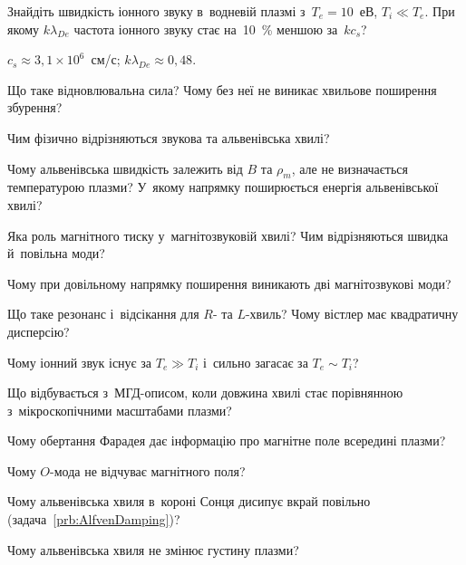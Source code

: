 \begin{problem}\label{prb:IonAcoustic}
	Знайдіть швидкість іонного звуку в~водневій плазмі з~$T_e=10$~еВ, $T_i\ll T_e$. При якому $k\lambda_{De}$
	частота іонного звуку стає на~10~\% меншою за~$kc_s$?
	\begin{solution}
		$c_s\approx3{,}1\times10^{6}$~см/с; $k\lambda_{De}\approx0{,}48$.
	\end{solution}
\end{problem}


\begin{Questions}
\begin{quizlist}

\item Що таке відновлювальна сила? Чому без неї не виникає хвильове поширення збурення?

\item Чим фізично відрізняються звукова та альвенівська хвилі?

\item Чому альвенівська швидкість залежить від $B$ та $\rho_m$, але не визначається
  температурою плазми? У~якому напрямку поширюється енергія альвенівської хвилі?

\item Яка роль магнітного тиску у~магнітозвуковій хвилі? Чим відрізняються швидка й~повільна моди?

\item Чому при довільному напрямку поширення виникають дві магнітозвукові моди?

\item Що таке резонанс і~відсікання для $R$- та $L$-хвиль? Чому вістлер має квадратичну дисперсію?

\item Чому іонний звук існує за $T_e\gg T_i$ і~сильно загасає за $T_e\sim T_i$?

\item Що відбувається з~МГД-описом, коли довжина хвилі стає порівнянною з~мікроскопічними
  масштабами плазми?

\item Чому обертання Фарадея дає інформацію про магнітне поле всередині плазми?

\item Чому $O$-мода не відчуває магнітного поля?

\item Чому альвенівська хвиля в~короні Сонця дисипує вкрай повільно (задача~\ref{prb:AlfvenDamping})?

\item Чому альвенівська хвиля не змінює густину плазми?

\end{quizlist}
\end{Questions}

